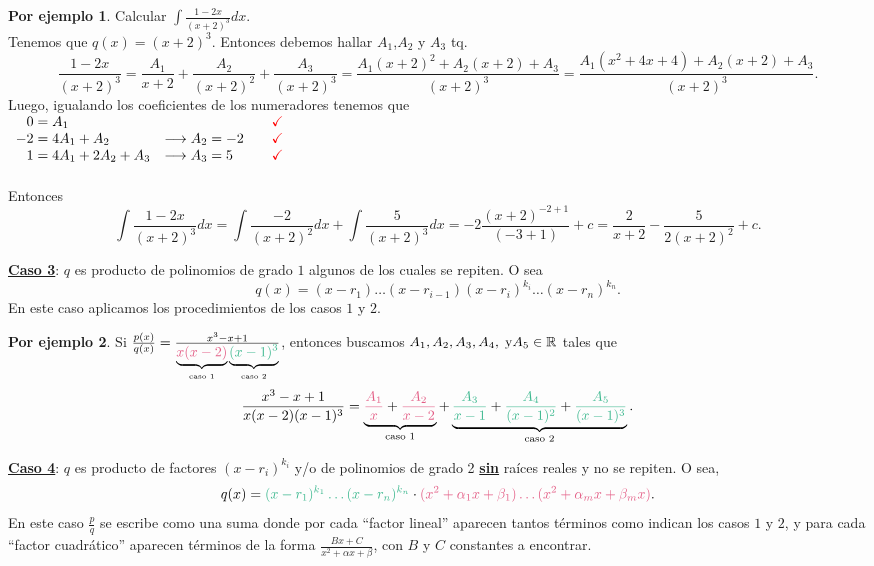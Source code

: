 \documentclass{article}
\theoremstyle{definition}
\newtheorem*{ej}{Por ejemplo}
\theoremstyle{remark}
\newcommand\R{\ensuremath{\mathbb{R}}}
\newcommand\ok{\checkmark}
\begin{document}
\begin{ej}
Calcular $\int\frac{1-2x}{(x+2)^3}dx$.\\
Tenemos que $q(x)=(x+2)^3$. Entonces debemos hallar $A_1$,$A_2$ y $A_3$ tq. \[
\frac{1-2x}{(x+2)^3}
=
\frac{A_1}{x+2}+\frac{A_2}{(x+2)^2}+\frac{A_3}{(x+2)^3}
=
\frac{A_1  (x+2)^2 + A_2  (x+2) + A_3}{(x+2)^3}
=
\frac{A_1(x^2+4x+4)+A_2(x+2)+A_3}{(x+2)^3}.
\]
Luego, igualando los coeficientes de los numeradores tenemos que \\
$\begin{array}{llll}
\phantom{-}0 = A_1        &                         &       & \textcolor{red}{\ok}    \\
-2=4A_1+A_2    & \longrightarrow A_2=-2  &       & \textcolor{red}{\ok}    \\
\phantom{-}1=4A_1+2A_2+A_3& \longrightarrow A_3 = 5 &       & \textcolor{red}{\ok}
\end{array}$ \\ \\
Entonces \[
\int{\frac{1-2x}{(x+2)^3}dx}
=
\int{\frac{-2}{(x+2)^2}dx}+\int{\frac{5}{(x+2)^3}dx}
=
-2\frac{(x+2)^{-2+1}}{(-3+1)}+c
=
\frac{2}{x+2}-\frac{5}{2(x+2)^2}+c.
\]
\end{ej}

\underline{\textbf{Caso 3}}: $q$ es producto de polinomios de grado $1$ algunos de los cuales se repiten. O sea \[
q(x)=(x-r_1)\dots(x-r_{i-1})(x-r_i)^{k_i}\dots(x-r_n)^{k_n}.
\]
En este caso aplicamos los procedimientos de los casos $1$ y $2$.

\begin{ej}
Si $\frac{p(x)}{q(x)}
=
\frac{x^3-x+1}{\underbrace{\textcolor{rojop}{x(x-2)}}_{\text{caso 1}}\underbrace{\textcolor{verdep}{(x-1)^3}}_{\text{caso 2}}}$, entonces buscamos $A_1, A_2, A_3, A_4, \; \text {y} \\ A_5 \in \R $ tales que \[
\frac{x^3-x+1}{x(x-2)(x-1)^3}
=
\underbrace{\textcolor{rojop}{\frac{A_1}{x}}+\textcolor{rojop}{\frac{A_2}{x-2}}}_{\text{caso 1}}
+
\underbrace{\textcolor{verdep}{\frac{A_3}{x-1}}+\textcolor{verdep}{\frac{A_4}{(x-1)^2}}+\textcolor{verdep}{\frac{A_5}{(x-1)^3}}}_{\text{caso 2}}.
\]
\end{ej}
\pagebreak
\underline{\textbf{Caso 4}}: $q$ es producto de factores $(x-r_i)^{k_i}$ y/o de polinomios de grado 2 \underline{\textbf{sin}} raíces reales y no se repiten. O sea, \[
q(x)=
\textcolor{verdep}{(x-r_1)^{k_1} \dots (x-r_n)^{k_n} }
\cdot
\textcolor{rojop}{(x^2+\alpha_1x+\beta_1) \dots (x^2+\alpha_mx+\beta_mx)}.
\]
En este caso $\frac{p}{q}$ se escribe como una suma donde por cada ``\textcolor{verdep}{factor lineal}''  aparecen tantos términos como indican los casos $1$ y $2$, y para cada ``\textcolor{rojop}{factor cuadrático}'' aparecen términos de la forma $\frac{Bx+C}{x^2+\alpha x+\beta}$, con $B$ y $C$ constantes a encontrar.
\end{document}
